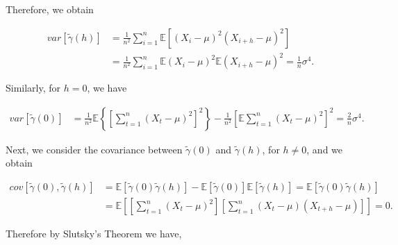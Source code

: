 \documentclass[]{book}
\theoremstyle{definition}
\theoremstyle{definition}
\theoremstyle{definition}
\theoremstyle{remark}
\begin{document}
Therefore, we obtain

\[\begin{aligned}
        var[\tilde{\gamma} \left( h \right)] &= \frac{1}{n^2}\sum\limits_{i = 1}^{n} \mathbb{E}\left[ {\left( {{X_i} - \mu} \right)^2\left( {{X_{i + h}} - \mu} \right)^2}\right]\\
        &= \frac{1}{n^2}\sum\limits_{i = 1}^{n} \mathbb{E}{\left( {{X_i} - \mu} \right)^2\mathbb{E}\left( {{X_{i + h}} - \mu} \right)^2}
        = \frac{1}{n}\sigma^4.
    \end{aligned}
\]

Similarly, for \(h = 0\), we have

\[
\begin{aligned}
        var[\tilde{\gamma} \left( 0 \right)] &= \frac{1}{n^2}\mathbb{E}\left\{\left[\sum\limits_{t = 1}^{n} {\left( {{X_t} - \mu} \right)^2}\right]^2\right\} - \frac{1}{n^2}\left[\mathbb{E}\sum\limits_{t = 1}^{n} {\left( {{X_t} - \mu} \right)^2}\right]^2
        = \frac{2}{n}\sigma^4.
    \end{aligned}
\]

Next, we consider the covariance between
\(\tilde{\gamma} \left( 0 \right)\) and
\(\tilde{\gamma} \left( h \right)\), for \(h \neq 0\), and we obtain

\[
\begin{aligned}
        cov[\tilde{\gamma} \left( 0 \right), \tilde{\gamma} \left( h \right)] &= \mathbb{E}[\tilde{\gamma} \left( 0 \right) \tilde{\gamma} \left( h \right)] - \mathbb{E}[\tilde{\gamma} \left( 0 \right)] \mathbb{E}[\tilde{\gamma} \left( h \right)]
        = \mathbb{E}[\tilde{\gamma} \left( 0 \right) \tilde{\gamma} \left( h \right)]\\
        &= \mathbb{E}\left[\left[\sum\limits_{t = 1}^{n} {\left( {{X_t} - \mu} \right)^2}\right]\left[\sum\limits_{t = 1}^{n} {\left( {{X_t} - \mu} \right)\left( {{X_{t + h}} - \mu} \right)}\right]\right]
        = 0.
    \end{aligned}
\]

Therefore by Slutsky's Theorem we have,
\end{document}
